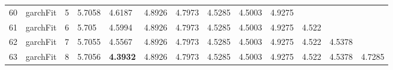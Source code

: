 \documentclass[10pt,a4paper]{article}
\begin{document}
\begin{table}[ht]
\begin{tabular}{rlrllllllllll}
  60 & garchFit &     5 & 5.7058 & 4.6187 & 4.8926 & 4.7973 & 4.5285 & 4.5003 & 4.9275 &  &  &  \\ 
  61 & garchFit &     6 & 5.705 & 4.5994 & 4.8926 & 4.7973 & 4.5285 & 4.5003 & 4.9275 & 4.522 &  &  \\ 
  62 & garchFit &     7 & 5.7055 & 4.5567 & 4.8926 & 4.7973 & 4.5285 & 4.5003 & 4.9275 & 4.522 & 4.5378 &  \\ 
  63 & garchFit &     8 & 5.7056 & \textbf{4.3932} & 4.8926 & 4.7973 & 4.5285 & 4.5003 & 4.9275 & 4.522 & 4.5378 & 4.7285 \\ 
   \hline
\end{tabular}
\end{table}
\end{document}
